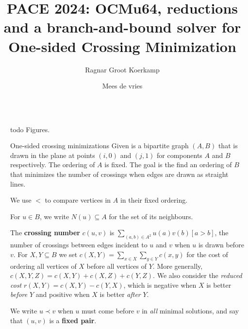 \documentclass[final]{beamer}
\title{PACE 2024: OCMu64, reductions and a branch-and-bound solver for\\ One-sided Crossing Minimization}
\author{Ragnar {Groot Koerkamp} \inst{1} \and Mees de vries \inst{2}}
\institute[shortinst]{\inst{1} ETH Zurich, @curious\_coding \samelineand
  \inst{2} Unaffiliated, The Netherlands}
\newlength{\sepwidth}
\newlength{\colwidth}
\newcommand{\separatorcolumn}{\begin{column}{\sepwidth}\end{column}}
\theoremstyle{remark}
\renewcommand{\b}{\prec}
\begin{document}


\begin{frame}[t]
  \begin{columns}[t]
    \separatorcolumn
    \begin{column}{\colwidth}

      \begin{alertblock}{todo}
        Figures.
      \end{alertblock}

      \begin{block}{One-sided crossing minimizations}
        Given is a bipartite graph $(A, B)$ that is drawn in the plane at points
        $(i, 0)$ and $(j,1)$ for components $A$ and $B$ respectively. The ordering of $A$
        is fixed. The goal is the find an ordering of $B$ that minimizes the number of
        crossings when edges are drawn as straight lines.

        We use $<$ to compare vertices in $A$ in their fixed ordering.

        For $u\in B$, we write $N(u) \subseteq A$ for the set of its neighbours.

        The \textbf{crossing number} $c(u, v)$ is $\sum_{(a, b) \in A^2}
        u(a)v(b)[a > b]$, the number of
        crossings between edges incident to $u$ and $v$ when $u$ is drawn before $v$.  For
        $X,Y\subseteq B$ we set $c(X,Y) = \sum_{x\in X}\sum_{y\in Y} c(x,y)$ for the cost of ordering
        all vertices of $X$ before all vertices of $Y$. More generally, $c(X,Y,Z) = c(X, Y) + c(X, Z) +
        c(Y, Z)$. We also consider the \emph{reduced cost} $r(X,Y) = c(X, Y) - c(Y, X)$, which is
        negative when $X$ is better \emph{before} $Y$ and positive when $X$ is better \emph{after} $Y$.

        We write $u\b v$ when $u$ must come before $v$ in \emph{all} minimal solutions, and say that $(u, v)$
        is a \textbf{fixed pair}.


\end{block}
\end{column}
\end{columns}
\end{frame}
\end{document}
